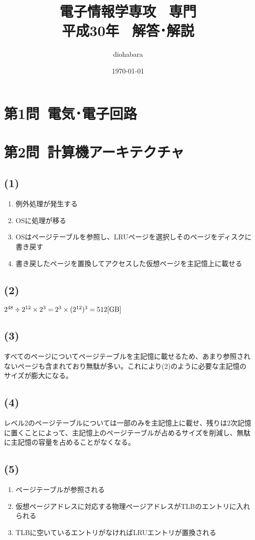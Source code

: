 \documentclass[a4paper,12pt,xelatex,ja=standard]{bxjsarticle}
\title{電子情報学専攻 \, 専門 \\ 平成30年 \, 解答･解説}
\author{diohabara}
\date{\today}
\begin{document}
\maketitle

\section*{第1問\ 電気･電子回路}

\section*{第2問\ 計算機アーキテクチャ}
\subsection*{(1)}
\begin{enumerate}
  \item 例外処理が発生する
  \item OSに処理が移る
  \item OSはページテーブルを参照し、LRUページを選択しそのページをディスクに書き戻す
  \item 書き戻したページを置換してアクセスした仮想ページを主記憶上に載せる
\end{enumerate}

\subsection*{(2)}
$2^{48} \divisionsymbol 2^{12} \times 2^3 = 2^3 \times (2^{12})^3 = 512\text{[GB]}$

\subsection*{(3)}
すべてのページについてページテーブルを主記憶に載せるため、あまり参照されないページも含まれており無駄が多い。これにより(2)のように必要な主記憶のサイズが膨大になる。

\subsection*{(4)}
レベル2のページテーブルについては一部のみを主記憶上に載せ、残りは2次記憶に置くことによって、主記憶上のページテーブルが占めるサイズを削減し、無駄に主記憶の容量を占めることがなくなる。

\subsection*{(5)}
\begin{enumerate}
  \item ページテーブルが参照される
  \item 仮想ページアドレスに対応する物理ページアドレスがTLBのエントリに入れられる
  \item TLBに空いているエントリがなければLRUエントリが置換される
\end{enumerate}
\end{document}
